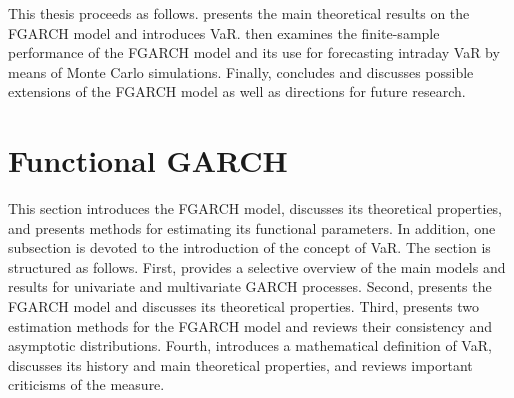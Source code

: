 \documentclass[12pt,a4paper]{article}
\theoremstyle{definition}
\begin{document}
This thesis proceeds as follows.  presents the main theoretical results on the FGARCH model and introduces VaR.  then examines the finite-sample performance of the FGARCH model and its use for forecasting intraday VaR by means of Monte Carlo simulations. Finally,  concludes and discusses possible extensions of the FGARCH model as well as directions for future research.
\section{Functional GARCH}
This section introduces the FGARCH model, discusses its theoretical properties, and presents methods for estimating its functional parameters. In addition, one subsection is devoted to the introduction of the concept of VaR. The section is structured as follows. First,  provides a selective overview of the main models and results for univariate and multivariate GARCH processes. Second,  presents the FGARCH model and discusses its theoretical properties. Third,  presents two estimation methods for the FGARCH model and reviews their consistency and asymptotic distributions. Fourth,  introduces a mathematical definition of VaR, discusses its history and main theoretical properties, and reviews important criticisms of the measure.
\label{sec:FGARCH}
\end{document}
